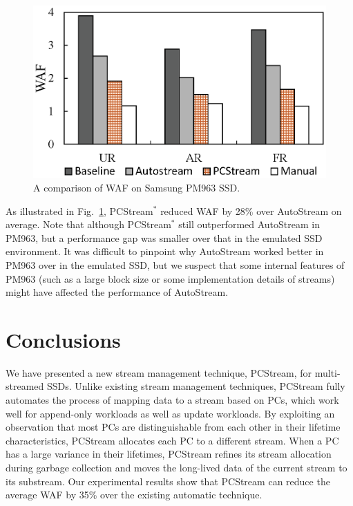 \begin{figure}[t]
	\centering
	\includegraphics[scale=0.6]{figure/pcstream/result_ssd}
	\caption{A comparison of WAF on Samsung PM963 SSD.}
	\label{fig:result_ssd}
\end{figure}


As illustrated in Fig.~\ref{fig:result_ssd}, \textsf{\small PCStream$^*$} reduced WAF by
28\% over \textsf{\small AutoStream} on average.  
Note that although \textsf{\small PCStream$^*$} still outperformed \textsf{\small AutoStream} in PM963, 
but a performance gap was smaller over that
in the emulated SSD environment.  It was difficult to pinpoint why
\textsf{\small AutoStream} worked better in PM963 over in the emulated SSD, but we
suspect that some internal features of PM963 (such as a large block size or some implementation details of streams) %
might have affected the performance of \textsf{\small AutoStream}.


\section{Conclusions}

We have presented a new stream management technique, \textsf{\small PCStream}, for multi-streamed SSDs.  
Unlike existing stream management techniques, \textsf{\small PCStream} fully automates 
the process of mapping data to a stream based on PCs, 
which work well for append-only workloads as well as update workloads.  
By exploiting an observation that most PCs are distinguishable from each other 
in their lifetime characteristics, \textsf{\small PCStream} allocates each PC to a different stream.  
When a PC has a large variance in their lifetimes, \textsf{\small PCStream} refines its stream allocation 
during garbage collection and moves the long-lived data of the current stream to its substream.  
Our experimental results show that \textsf{\small PCStream} can reduce the average WAF by 35\% over the existing %
automatic technique.

